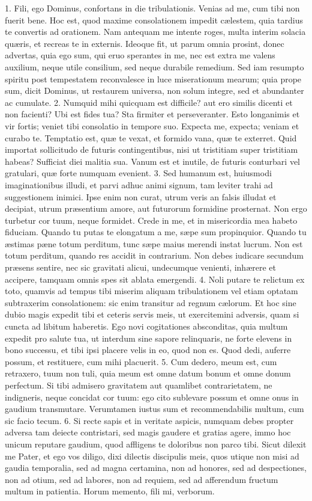 1. Fili, ego Dominus, confortans in die tribulationis. Venias ad me, cum tibi non fuerit bene. Hoc est, quod maxime consolationem impedit cælestem, quia tardius te convertis ad orationem. Nam antequam me intente roges, multa interim solacia quæris, et recreas te in externis. Ideoque fit, ut parum omnia prosint, donec advertas, quia ego sum, qui eruo sperantes in me, nec est extra me valens auxilium, neque utile consilium, sed neque durabile remedium. Sed iam resumpto spiritu post tempestatem reconvalesce in luce miserationum mearum; quia prope sum, dicit Dominus, ut restaurem universa, non solum integre, sed et abundanter ac cumulate.
2. Numquid mihi quicquam est difficile? aut ero similis dicenti et non facienti? Ubi est fides tua? Sta firmiter et perseveranter. Esto longanimis et vir fortis; veniet tibi consolatio in tempore suo. Expecta me, expecta; veniam et curabo te. Temptatio est, quæ te vexat, et formido vana, quæ te exterret. Quid importat sollicitudo de futuris contingentibus, nisi ut tristitiam super tristitiam habeas? Sufficiat diei malitia sua. Vanum est et inutile, de futuris conturbari vel gratulari, quæ forte numquam evenient.
3. Sed humanum est, huiusmodi imaginationibus illudi, et parvi adhuc animi signum, tam leviter trahi ad suggestionem inimici. Ipse enim non curat, utrum veris an falsis illudat et decipiat, utrum præsentium amore, aut futurorum formidine prosternat. Non ergo turbetur cor tuum, neque formidet. Crede in me, et in misericordia mea habeto fiduciam. Quando tu putas te elongatum a me, sæpe sum propinquior. Quando tu æstimas pæne totum perditum, tunc sæpe maius merendi instat lucrum. Non est totum perditum, quando res accidit in contrarium. Non debes iudicare secundum præsens sentire, nec sic gravitati alicui, undecumque venienti, inhærere et accipere, tamquam omnis spes sit ablata emergendi.
4. Noli putare te relictum ex toto, quamvis ad tempus tibi miserim aliquam tribulationem vel etiam optatam subtraxerim consolationem: sic enim transitur ad regnum cælorum. Et hoc sine dubio magis expedit tibi et ceteris servis meis, ut exercitemini adversis, quam si cuncta ad libitum haberetis. Ego novi cogitationes absconditas, quia multum expedit pro salute tua, ut interdum sine sapore relinquaris, ne forte elevens in bono successu, et tibi ipsi placere velis in eo, quod non es. Quod dedi, auferre possum, et restituere, cum mihi placuerit.
5. Cum dedero, meum est, cum retraxero, tuum non tuli, quia meum est omne datum bonum et omne donum perfectum. Si tibi admisero gravitatem aut quamlibet contrarietatem, ne indigneris, neque concidat cor tuum: ego cito sublevare possum et omne onus in gaudium transmutare. Verumtamen iustus sum et recommendabilis multum, cum sic facio tecum.
6. Si recte sapis et in veritate aspicis, numquam debes propter adversa tam deiecte contristari, sed magis gaudere et gratias agere, immo hoc unicum reputare gaudium, quod affligens te doloribus non parco tibi. Sicut dilexit me Pater, et ego vos diligo, dixi dilectis discipulis meis, quos utique non misi ad gaudia temporalia, sed ad magna certamina, non ad honores, sed ad despectiones, non ad otium, sed ad labores, non ad requiem, sed ad afferendum fructum multum in patientia. Horum memento, fili mi, verborum.


